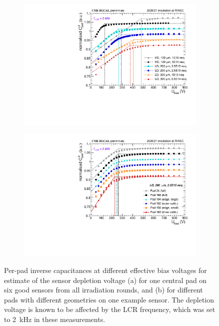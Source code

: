 \begin{figure}
	\captionsetup[subfigure]{aboveskip=-1pt,belowskip=-1pt}
	\centering
	\begin{subfigure}[b]{0.49\textwidth}
		\includegraphics[width=0.999\textwidth]{plots/channel_cv/channel_invCV_sensors_sensors.pdf}
		\subcaption{
		}
		\label{plot:pad_invCV_sensor}
	\end{subfigure}
	\hfill
	\begin{subfigure}[b]{0.49\textwidth}
		\includegraphics[width=0.999\textwidth]{plots/channel_cv/channel_invCV_sensors_channels.pdf}
		\subcaption{
		}
		\label{plot:pad_invCV_channels}
	\end{subfigure}
	\caption{
		Per-pad inverse capacitances at different effective bias voltages for estimate of the sensor depletion voltage (a) for one central pad on six good sensors from all irradiation rounds, and (b) for different pads with different geometries on one example sensor.
		The depletion voltage is known to be affected by the LCR frequency, which was set to \SI{2}{\kilo\hertz} in these measurements.
	}
\end{figure}


